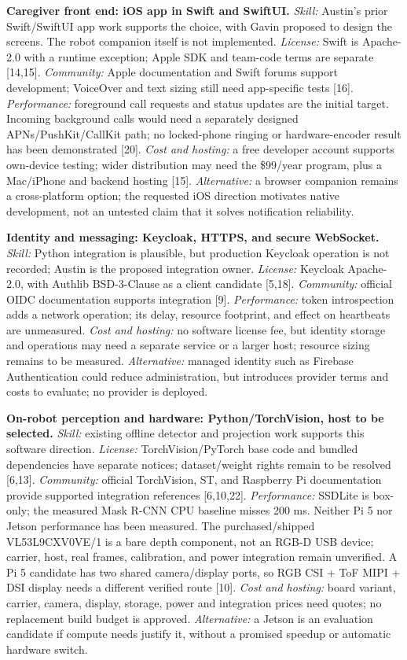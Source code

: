 \documentclass[12pt,letterpaper]{article}
\begin{document}
\textbf{Caregiver front end: iOS app in Swift and SwiftUI.} \emph{Skill:} Austin's prior Swift/SwiftUI app work supports the choice, with Gavin proposed to design the screens. The robot companion itself is not implemented. \emph{License:} Swift is Apache-2.0 with a runtime exception; Apple SDK and team-code terms are separate [14,15]. \emph{Community:} Apple documentation and Swift forums support development; VoiceOver and text sizing still need app-specific tests [16]. \emph{Performance:} foreground call requests and status updates are the initial target. Incoming background calls would need a separately designed APNs/PushKit/CallKit path; no locked-phone ringing or hardware-encoder result has been demonstrated [20]. \emph{Cost and hosting:} a free developer account supports own-device testing; wider distribution may need the \$99/year program, plus a Mac/iPhone and backend hosting [15]. \emph{Alternative:} a browser companion remains a cross-platform option; the requested iOS direction motivates native development, not an untested claim that it solves notification reliability.

\textbf{Identity and messaging: Keycloak, HTTPS, and secure WebSocket.} \emph{Skill:} Python integration is plausible, but production Keycloak operation is not recorded; Austin is the proposed integration owner. \emph{License:} Keycloak Apache-2.0, with Authlib BSD-3-Clause as a client candidate [5,18]. \emph{Community:} official OIDC documentation supports integration [9]. \emph{Performance:} token introspection adds a network operation; its delay, resource footprint, and effect on heartbeats are unmeasured. \emph{Cost and hosting:} no software license fee, but identity storage and operations may need a separate service or a larger host; resource sizing remains to be measured. \emph{Alternative:} managed identity such as Firebase Authentication could reduce administration, but introduces provider terms and costs to evaluate; no provider is deployed.

\textbf{On-robot perception and hardware: Python/TorchVision, host to be selected.} \emph{Skill:} existing offline detector and projection work supports this software direction. \emph{License:} TorchVision/PyTorch base code and bundled dependencies have separate notices; dataset/weight rights remain to be resolved [6,13]. \emph{Community:} official TorchVision, ST, and Raspberry Pi documentation provide supported integration references [6,10,22]. \emph{Performance:} SSDLite is box-only; the measured Mask R-CNN CPU baseline misses 200 ms. Neither Pi 5 nor Jetson performance has been measured. The purchased/shipped VL53L9CXV0VE/1 is a bare depth component, not an RGB-D USB device; carrier, host, real frames, calibration, and power integration remain unverified. A Pi 5 candidate has two shared camera/display ports, so RGB CSI + ToF MIPI + DSI display needs a different verified route [10]. \emph{Cost and hosting:} board variant, carrier, camera, display, storage, power and integration prices need quotes; no replacement build budget is approved. \emph{Alternative:} a Jetson is an evaluation candidate if compute needs justify it, without a promised speedup or automatic hardware switch.
\end{document}
